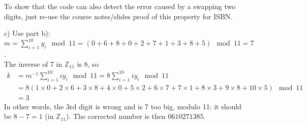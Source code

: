\documentclass[11pt]{article}
\newcommand{\ds}{\displaystyle}
\begin{document}
\begin{itemize}
    To show that the code can also detect the error caused by a swapping two
    digits, just re-use the course notes/slides proof of this property
    for ISBN.
  \item[{c)}] Use part b): $\ds
      m = \sum^{10}_{i=1} y_i \mod{11}
        = (0+6+8+0+2+7+1+3+8+5) \mod{11} = 7$.\\
    The inverse of 7 in $\mathbb{Z}_{11}$ is 8,
    so
    \begin{align*}
      k&= m^{-1}\sum^{10}_{i=1} i y_i\mod{11}
        = 8\sum^{10}_{i=1} i y_i\mod{11}\\
       &= 8(1\times 0
          + 2\times 6
          + 3\times 8
          + 4\times 0
          + 5\times 2
          + 6\times 7
          + 7\times 1
          + 8\times 3
          + 9\times 8
          +10\times 5)\mod{11}\\
       &= 3
    \end{align*}
    In other words, the 3rd digit is wrong
    and is 7 too big, modulo 11: it should be $8 - 7 = 1$ (in $\mathbb{Z}_{11}$).
    The corrected number is then $0610271385$.
\end{itemize}
\end{document}
